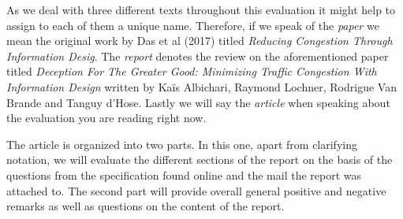 \documentclass[../review.tex]{subfiles}
\begin{document}
As we deal with three different texts throughout this evaluation it might help to assign to each of them a unique name. Therefore, if we speak of the  \textit{paper} we mean the original work by Das et al (2017) titled \textit{Reducing Congestion Through Information Desig}. The \textit{report} denotes the review on the aforementioned paper titled \textit{Deception For The Greater Good: Minimizing Traffic Congestion With Information Design} written by Ka\"{i}s Albichari, Raymond Lochner, Rodrigue Van Brande and Tanguy d'Hose. Lastly we will say the \textit{article} when speaking about the evaluation you are reading right now.

The article is organized into two parts. In this one, apart from clarifying notation, we will evaluate the different sections of the report on the basis of the questions from the specification found online and the mail the report was attached to. The second part will provide overall general positive and negative remarks as well as questions on the content of the report.
\end{document}
